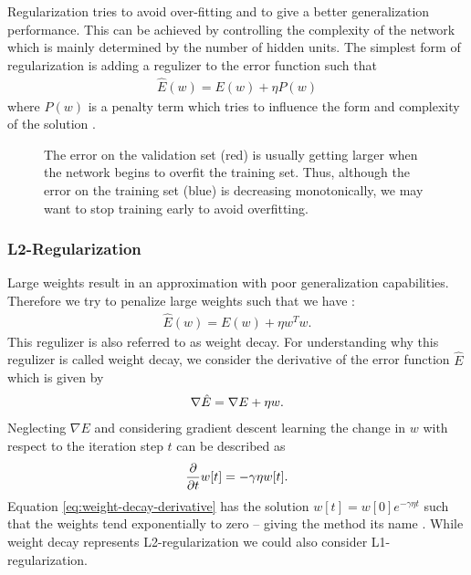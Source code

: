 Regularization tries to avoid over-fitting and to give a better generalization performance. This can be achieved by controlling the complexity of the network which is mainly determined by the number of hidden units. The simplest form of regularization is adding a regulizer to the error function such that
\begin{align}
\hat{E}(w) = E(w) + \eta P(w)
\end{align}
where $P(w)$ is a penalty term which tries to influence the form and complexity of the solution \cite[p.~338]{Bishop:1995}.

\begin{SCfigure}[\sidecaptionrelwidth][t!]
	\centering
    	\caption[Early stopping based on a validation set.]{The error on the validation set (red) is usually getting larger when the network begins to overfit the training set. Thus, although the error on the training set (blue) is decreasing monotonically, we may want to stop training early to avoid overfitting.}
    	\label{fig:early-stopping}
\end{SCfigure}

\subsubsection{L2-Regularization}

Large weights result in an approximation with poor generalization capabilities. Therefore we try to penalize large weights such that we have \cite[p.~338-343]{Bishop:1995}:
\begin{align}
\hat{E}(w) = E(w) + \eta w^T w.
\end{align}
This regulizer is also referred to as weight decay. For understanding why this regulizer is called weight decay, we consider the derivative of the error function $\hat{E}$ which is given by
\begin{align}
\nabla \hat{E} = \nabla E + \eta w\onedot
\end{align}
Neglecting $\nabla E$ and considering gradient descent learning the change in $w$ with respect to the iteration step $t$ can be described as
\begin{align}
\label{eq:weight-decay-derivative}
\frac{\partial}{\partial t} w[t] = - \gamma \eta w[t]\onedot
\end{align}
Equation \eqref{eq:weight-decay-derivative} has the solution $w[t] = w[0] e^{- \gamma \eta t}$ such that the weights tend exponentially to zero -- giving the method its name \cite[p.~338-340]{Bishop:1995}. While weight decay represents L2-regularization we could also consider L1-regularization.

